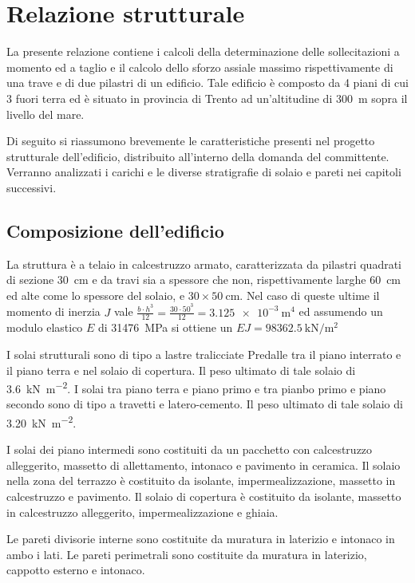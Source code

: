 \chapter{Relazione strutturale}
La presente relazione contiene i calcoli della determinazione delle sollecitazioni a momento ed a taglio e il calcolo dello sforzo assiale massimo rispettivamente di una trave e di due pilastri di un edificio. 
Tale edificio è composto da 4 piani di cui 3 fuori terra ed è situato in provincia di Trento ad un'altitudine di \SI{300}{\meter} sopra il livello del mare.

Di seguito si riassumono brevemente le caratteristiche presenti nel progetto strutturale dell'edificio, distribuito all'interno della domanda del committente.
Verranno analizzati i carichi e le diverse stratigrafie di solaio e pareti nei capitoli successivi.
\section{Composizione dell'edificio}
La struttura è a telaio in calcestruzzo armato, caratterizzata da pilastri quadrati di sezione \SI{30}{\centi\meter} e da travi sia a spessore che non, rispettivamente larghe \SI{60}{\centi\meter} ed alte come lo spessore del solaio, e $30 \times \SI{50}{\centi\metre}$.
Nel caso di queste ultime il momento di inerzia $J$ vale $\frac{b\cdot h^3}{12}=\frac{30\cdot50^3}{12}=\SI{3.125e-3}{\meter^4}$ ed assumendo un modulo elastico $E$ di \SI{31476}{\mega\pascal} si ottiene un $EJ=\SI{98362.5}{\kilo\newton\per\meter\squared}$

I solai strutturali sono di tipo a lastre tralicciate Predalle tra il piano interrato e il piano terra e nel solaio di copertura. 
Il peso ultimato di tale solaio di \SI{3.6}{\kilo\newton\per\square\meter}.
I solai tra piano terra e piano primo e tra pianbo primo e piano secondo sono di tipo a travetti e latero-cemento.
Il peso ultimato di tale solaio di \SI{3.20}{\kilo\newton\per\square\meter}.

I solai dei piano intermedi sono costituiti da un pacchetto con calcestruzzo alleggerito, massetto di allettamento, intonaco e pavimento in ceramica.
Il solaio nella zona del terrazzo è costituito da isolante, impermealizzazione, massetto in calcestruzzo e pavimento.
Il solaio di copertura è costituito da isolante, massetto in calcestruzzo alleggerito, impermealizzazione e ghiaia.

Le pareti divisorie interne sono costituite da muratura in laterizio e intonaco in ambo i lati.
Le pareti perimetrali sono costituite da muratura in laterizio, cappotto esterno e intonaco.

